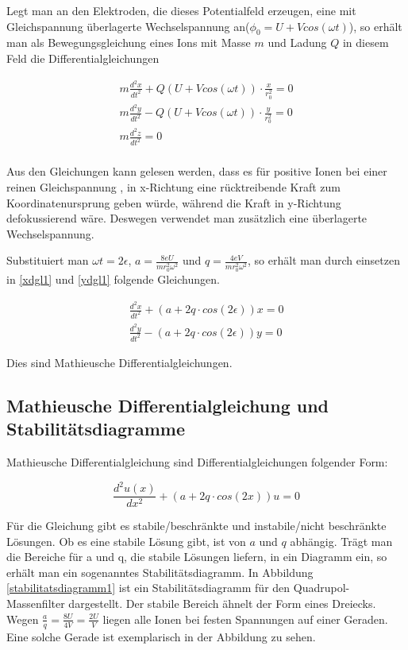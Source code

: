 \documentclass[10pt,a4paper]{article}
\begin{document}
 Legt man an den Elektroden, die dieses Potentialfeld erzeugen, eine mit Gleichspannung überlagerte Wechselspannung an($\phi _0 = U + V cos(\omega t)$), so erhält man als Bewegungsgleichung eines Ions mit Masse $m$ und Ladung $Q$ in diesem Feld die Differentialgleichungen

\begin{align}
	m\frac{d^2x}{dt^2} + Q(U + V cos(\omega t)) \cdot \frac{x}{r_0^2} = 0 
	\label{xdgl1}\\
	m\frac{d^2y}{dt^2} - Q(U + V cos(\omega t)) \cdot \frac{y}{r_0^2} = 0 
	\label{ydgl1}\\
	m\frac{d^2z}{dt^2} = 0 \\
\end{align}

Aus den Gleichungen kann gelesen werden, dass es für positive Ionen bei einer reinen Gleichspannung , in x-Richtung eine rücktreibende Kraft zum Koordinatenursprung geben würde, während die Kraft in y-Richtung defokussierend wäre. Deswegen verwendet man zusätzlich eine überlagerte Wechselspannung.

Substituiert man $\omega t = 2\epsilon$, $a = \frac{8 e U}{m r_0^2 \omega^2}$ und $q = \frac{4 e V}{m r_0^2 \omega^2}$, so erhält man durch einsetzen in \eqref{xdgl1} und \eqref{ydgl1} folgende Gleichungen.

\begin{align}
	\frac{d^2x}{dt^2} + (a + 2q \cdot cos(2\epsilon)) x = 0\\
	\frac{d^2y}{dt^2} - (a + 2q \cdot cos(2\epsilon)) y = 0
\end{align}

Dies sind Mathieusche Differentialgleichungen.



\subsection{Mathieusche Differentialgleichung und Stabilitätsdiagramme}

Mathieusche Differentialgleichung sind Differentialgleichungen folgender Form:

\begin{equation}
	\frac{d^2u(x)}{dx^2} + (a + 2q \cdot cos(2x)) u = 0
\end{equation}

Für die Gleichung gibt es stabile/beschränkte und instabile/nicht beschränkte Lösungen. Ob es eine stabile Lösung gibt, ist von $a$ und $q$ abhängig. Trägt man die Bereiche für a und q, die stabile Lösungen liefern, in ein Diagramm ein, so erhält man ein sogenanntes Stabilitätsdiagramm. In Abbildung \ref{stabilitatsdiagramm1} ist ein Stabilitätsdiagramm für den Quadrupol-Massenfilter dargestellt. Der stabile Bereich ähnelt der Form eines Dreiecks. Wegen $\frac{a}{q} = \frac{8 U}{4 V} = \frac{2 U}{V}$ liegen alle Ionen bei festen Spannungen auf einer Geraden. Eine solche Gerade ist exemplarisch in der Abbildung zu sehen. 
\end{document}
